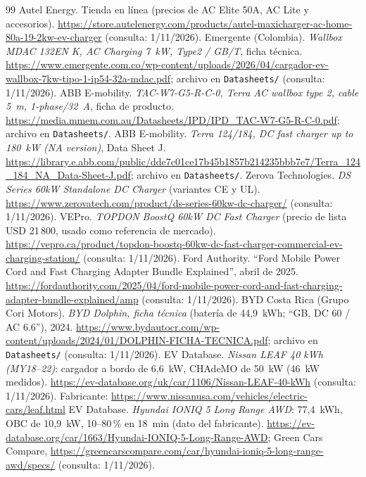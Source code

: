 \begin{thebibliography}{99}
 Autel Energy. Tienda en línea (precios de AC Elite 50A, AC Lite y accesorios). \url{https://store.autelenergy.com/products/autel-maxicharger-ac-home-80a-19-2kw-ev-charger} (consulta: 1/11/2026).
 Emergente (Colombia). \emph{Wallbox MDAC 132EN K, AC Charging 7~kW, Type2 / GB/T}, ficha técnica. \url{https://www.emergente.com.co/wp-content/uploads/2026/04/cargador-ev-wallbox-7kw-tipo-1-ip54-32a-mdac.pdf}; archivo en \texttt{Datasheets/} (consulta: 1/11/2026).
 ABB E-mobility. \emph{TAC-W7-G5-R-C-0, Terra AC wallbox type 2, cable 5~m, 1-phase/32~A}, ficha de producto. \url{https://media.mmem.com.au/Datasheets/IPD/IPD_TAC-W7-G5-R-C-0.pdf}; archivo en \texttt{Datasheets/}.
 ABB E-mobility. \emph{Terra 124/184, DC fast charger up to 180~kW (NA version)}, Data Sheet J. \url{https://library.e.abb.com/public/dde7c01ce17b45b1857b214235bbb7e7/Terra_124_184_NA_Data-Sheet-J.pdf}; archivo en \texttt{Datasheets/}.
 Zerova Technologies. \emph{DS Series 60kW Standalone DC Charger} (variantes CE y UL). \url{https://www.zerovatech.com/product/ds-series-60kw-dc-charger/} (consulta: 1/11/2026).
 VEPro. \emph{TOPDON BoostQ 60kW DC Fast Charger} (precio de lista USD 21\,800, usado como referencia de mercado). \url{https://vepro.ca/product/topdon-boostq-60kw-dc-fast-charger-commercial-ev-charging-station/} (consulta: 1/11/2026).
 Ford Authority. ``Ford Mobile Power Cord and Fast Charging Adapter Bundle Explained'', abril de 2025. \url{https://fordauthority.com/2025/04/ford-mobile-power-cord-and-fast-charging-adapter-bundle-explained/amp} (consulta: 1/11/2026).
 BYD Costa Rica (Grupo Cori Motors). \emph{BYD Dolphin, ficha técnica} (batería de 44,9~kWh; ``GB, DC 60 / AC 6.6''), 2024. \url{https://www.bydautocr.com/wp-content/uploads/2024/01/DOLPHIN-FICHA-TECNICA.pdf}; archivo en \texttt{Datasheets/} (consulta: 1/11/2026).
 EV Database. \emph{Nissan LEAF 40 kWh (MY18--22)}: cargador a bordo de 6,6~kW, CHAdeMO de 50~kW (46~kW medidos). \url{https://ev-database.org/uk/car/1106/Nissan-LEAF-40-kWh} (consulta: 1/11/2026). Fabricante: \url{https://www.nissanusa.com/vehicles/electric-cars/leaf.html}
 EV Database. \emph{Hyundai IONIQ 5 Long Range AWD}: 77,4~kWh, OBC de 10,9~kW, 10--80\,\% en 18~min (dato del fabricante). \url{https://ev-database.org/car/1663/Hyundai-IONIQ-5-Long-Range-AWD}; Green Cars Compare, \url{https://greencarscompare.com/car/hyundai-ioniq-5-long-range-awd/specs/} (consulta: 1/11/2026).

\end{thebibliography}
